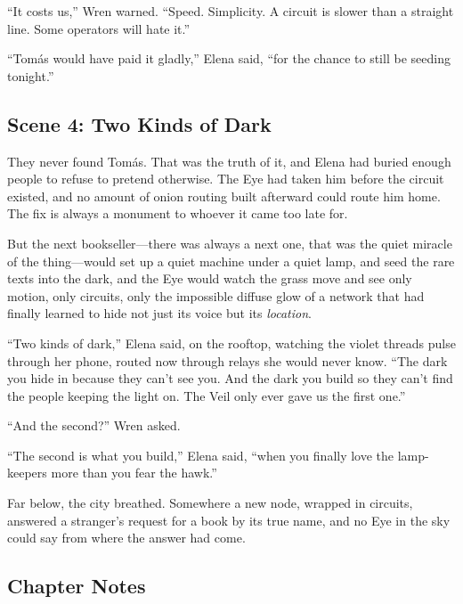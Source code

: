 ``It costs us,'' Wren warned. ``Speed. Simplicity. A circuit is slower than a
straight line. Some operators will hate it.''

``Tomás would have paid it gladly,'' Elena said, ``for the chance to still be
seeding tonight.''

\hypertarget{scene-4-two-kinds-of-dark}{%
\subsection{Scene 4: Two Kinds of
Dark}\label{scene-4-two-kinds-of-dark}}

They never found Tomás. That was the truth of it, and Elena had buried enough
people to refuse to pretend otherwise. The Eye had taken him before the circuit
existed, and no amount of onion routing built afterward could route him home. The
fix is always a monument to whoever it came too late for.

But the next bookseller---there was always a next one, that was the quiet
miracle of the thing---would set up a quiet machine under a quiet lamp, and seed
the rare texts into the dark, and the Eye would watch the grass move and see only
motion, only circuits, only the impossible diffuse glow of a network that had
finally learned to hide not just its voice but its \emph{location}.

``Two kinds of dark,'' Elena said, on the rooftop, watching the violet threads
pulse through her phone, routed now through relays she would never know. ``The
dark you hide in because they can't see you. And the dark you build so they can't
find the people keeping the light on. The Veil only ever gave us the first one.''

``And the second?'' Wren asked.

``The second is what you build,'' Elena said, ``when you finally love the
lamp-keepers more than you fear the hawk.''

Far below, the city breathed. Somewhere a new node, wrapped in circuits, answered
a stranger's request for a book by its true name, and no Eye in the sky could say
from where the answer had come.

\hypertarget{chapter-14-notes}{%
\subsection{Chapter Notes}\label{chapter-14-notes}}

